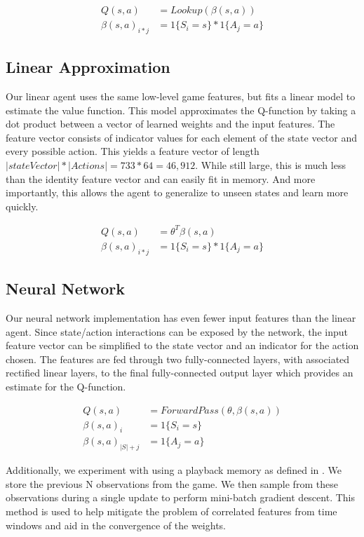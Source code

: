\documentclass[12pt]{article}
\begin{document}
\begin{align*}
Q(s,a) &= Lookup(\beta(s,a))\\
\beta(s,a)_{i*j} &= 1\{ S_i = s \} * 1\{ A_j = a \}
\end{align*}

\subsection{Linear Approximation}


Our linear agent uses the same low-level game features, but fits a linear model to estimate the value function. This model approximates the Q-function by taking a dot product between a vector of learned weights and the input features. The feature vector consists of indicator values for each element of the state vector and every possible action. This yields a feature vector of length $|stateVector| * |Actions| = 733 * 64 = 46,912$. While still large, this is much less than the identity feature vector and can easily fit in memory. And more importantly, this allows the agent to generalize to unseen states and learn more quickly.

\begin{align*}
Q(s,a) &= \theta^T \beta(s,a)\\
\beta(s,a)_{i*j} &= 1\{ S_i = s \} * 1\{ A_j = a \}
\end{align*}

\subsection{Neural Network}

Our neural network implementation has even fewer input features than the linear agent. Since state/action interactions can be exposed by the network, the input feature vector can be simplified to the state vector and an indicator for the action chosen. The features are fed through two fully-connected layers, with associated rectified linear layers, to the final fully-connected output layer which provides an estimate for the Q-function.

\begin{align*}
Q(s,a) &= ForwardPass(\theta, \beta(s, a))\\
\beta(s,a)_{i} &= 1 \{ S_i = s \}\\
\beta(s,a)_{|S| + j} &= 1 \{ A_j = a \}
\end{align*}

Additionally, we experiment with using a playback memory as defined in \cite{mnih2013playing}. We store the previous N observations from the game. We then sample from these observations during a single update to perform mini-batch gradient descent. This method is used to help mitigate the problem of correlated features from time windows and aid in the convergence of the weights.
\end{document}
